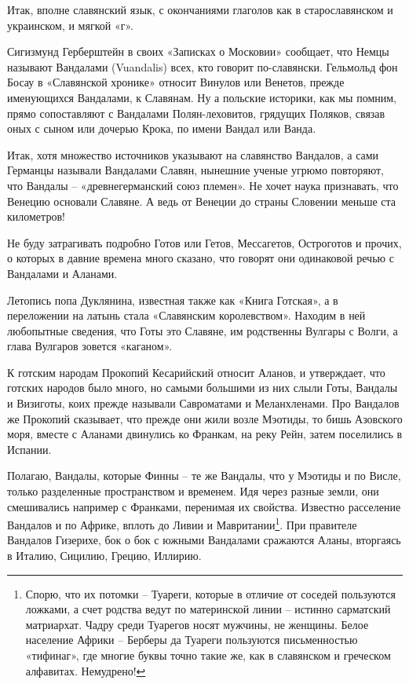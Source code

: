 Итак, вполне славянский язык, с окончаниями глаголов как в старославянском и украинском, и мягкой «г».

Сигизмунд Герберштейн в своих «Записках о Московии» сообщает, что Немцы называют Вандалами (Vuand\-alis) всех, кто говорит по-славянски. Гельмольд фон Босау в «Славянской хронике» относит Винулов или Венетов, прежде именующихся Вандалами, к Славянам. Ну а польские историки, как мы помним, прямо сопоставляют с Вандалами Полян-леховитов, грядущих Поляков, связав оных с сыном или дочерью Крока, по имени Вандал или Ванда.

Итак, хотя множество источников указывают на славянство Вандалов, а сами Германцы называли Вандалами Славян, нынешние ученые угрюмо повторяют, что Вандалы – «древнегерманский союз племен». Не хочет наука признавать, что Венецию основали Славяне. А ведь от Венеции до страны Словении меньше ста километров!

Не буду затрагивать подробно Готов или Гетов, Мессагетов, Остроготов и прочих, о которых в давние времена много сказано, что говорят они одинаковой речью с Вандалами и Аланами. 

Летопись попа Дуклянина, известная также как «Книга Готская», а в переложении на латынь стала «Славянским королевством». Находим в ней любопытные сведения, что Готы это Славяне, им родственны Вулгары с Волги, а глава Вулгаров зовется «каганом».

К готским народам Прокопий Кесарийский относит Аланов, и утверждает, что готских народов было много, но самыми большими из них слыли Готы, Вандалы и Визиготы, коих прежде называли Савроматами и Меланхленами. Про Вандалов же Прокопий сказывает, что прежде они жили возле Мэотиды, то бишь Азовского моря, вместе с Аланами двинулись ко Франкам, на реку Рейн, затем поселились в Испании.

Полагаю, Вандалы, которые Финны – те же Вандалы, что у Мэотиды и по Висле, только разделенные пространством и временем. Идя через разные земли, они смешивались например с Франками, перенимая их свойства. Известно расселение Вандалов и по Африке, вплоть до Ливии и Мавритании\footnote{Спорю, что их потомки – Туареги, которые в отличие от соседей пользуются ложками, а счет родства ведут по материнской линии – истинно сарматский матриархат. Чадру среди Туарегов носят мужчины, не женщины. Белое население Африки – Берберы да Туареги пользуются письменностью «тифинаг», где многие буквы точно такие же, как в славянском и греческом алфавитах. Немудрено!}. При правителе Вандалов Гизерихе, бок о бок с южными Вандалами сражаются Аланы, вторгаясь в Италию, Сицилию, Грецию, Иллирию.

